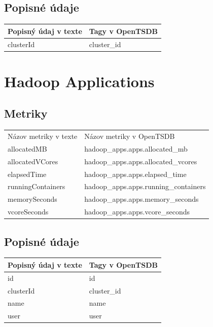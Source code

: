 \documentclass[printed,11pt,twoside,color,cover,table]{fithesis3}
\begin{document}
\begin{appendices}
\subsection{Popisné údaje}
\begin{center}
    \begin{tabular}{| l | l |}
    \hline
    Popisný údaj v texte & Tagy v OpenTSDB \\ \hline
    clusterId & cluster\_id\\ \hline
    \end{tabular}
\end{center}


\section{Hadoop Applications}
\subsection{Metriky}
\begin{center}
    \begin{tabular}{| l | l |}
    \hline
    Názov metriky v texte & Názov metriky v OpenTSDB\\
	allocatedMB & hadoop\_apps.apps.allocated\_mb\\ \hline
    allocatedVCores & hadoop\_apps.apps.allocated\_vcores\\ \hline
    elapsedTime & hadoop\_apps.apps.elapsed\_time\\ \hline
    runningContainers & hadoop\_apps.apps.running\_containers\\ \hline 
    memorySeconds & hadoop\_apps.apps.memory\_seconds\\ \hline
    vcoreSeconds & hadoop\_apps.apps.vcore\_seconds\\ \hline
    \end{tabular}
\end{center}

\subsection{Popisné údaje}
\begin{center}
    \begin{tabular}{| l | l |}
    \hline
    Popisný údaj v texte & Tagy v OpenTSDB \\ \hline
    id & id\\ \hline
    clusterId & cluster\_id\\ \hline
    name & name\\ \hline
    user & user\\ \hline
    \end{tabular}
\end{center}



\end{appendices}
\end{document}
